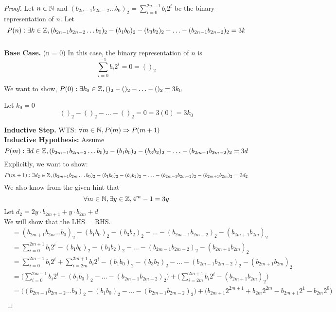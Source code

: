 \documentclass[12pt]{article}
\theoremstyle{definition}
\begin{document}
\begin{enumerate}
        \begin{proof}
            Let $n \in \mathbb N$ and $(b_{2n-1} b_{2n-2} \ldots b_0)_2 = \sum_{i=0}^{2n-1}b_i2^i$ be the binary representation of $n$.
            Let $$P(n): \exists k \in \mathbb Z, (b_{2n-1} b_{2n-2} \ldots b_0)_2 - (b_1b_0)_2 - (b_3b_2)_2 - \ldots - (b_{2n-1}b_{2n-2})_2 = 3k$$ \\
            \textbf{Base Case. }(n = 0)
            In this case, the binary representation of $n$ is $$\sum_{i=0}^{-1}b_i2^i = 0 = ()_2$$
            
            We want to show, $P(0): \exists k_0 \in \mathbb Z, ()_2 - ()_2 - \ldots - ()_2 = 3k_0$
            
            Let $k_0 = 0$
            $$()_2 - ()_2 - \ldots - ()_2 = 0 = 3(0) = 3k_0$$
            
            \textbf{Inductive Step. } WTS: $\forall m \in \mathbb N, P(m) \mathrel{\Rightarrow} P(m+1)$ \\
            \textbf{Inductive Hypothesis: } Assume $$P(m): \exists d \in \mathbb Z, (b_{2m-1} b_{2m-2} \ldots b_0)_2 - (b_1b_0)_2 - (b_3b_2)_2 - \ldots - (b_{2m-1}b_{2m-2})_2 = 3d$$ 
            Explicitly, we want to show:
            $$P(m+1): \exists d_2 \in \mathbb Z, (b_{2m+1} b_{2m} \ldots b_0)_2 - (b_1b_0)_2 - (b_3b_2)_2 - \ldots - (b_{2m-1}b_{2m-2})_2 - (b_{2m+1}b_{2m})_2 = 3d_2$$
            We also know from the given hint that $$\forall m \in \mathbb N, \exists y \in \mathbb Z, 4^m - 1 = 3y $$
            Let $d_2 = 2y \cdot b_{2m+1} + y \cdot b_{2m} + d$\\
            We will show that the LHS = RHS.
            \begin{align*}
                &= (b_{2m+1} b_{2m} \ldots b_0)_2 - (b_1b_0)_2 - (b_3b_2)_2 - \ldots - (b_{2m-1}b_{2m-2})_2 - (b_{2m+1}b_{2m})_2 \\
                &= \sum_{i=0}^{2m+1} b_i2^i - (b_1b_0)_2 - (b_3b_2)_2 - \ldots - (b_{2m-1}b_{2m-2})_2 - (b_{2m+1}b_{2m})_2 \\
                &= \sum_{i=0}^{2m-1} b_i2^i + \sum_{i=2m}^{2m+1} b_i2^i  - (b_1b_0)_2 - (b_3b_2)_2 - \ldots - (b_{2m-1}b_{2m-2})_2 - (b_{2m+1}b_{2m})_2 \\
                &= \bigg(\sum_{i=0}^{2m-1} b_i2^i - (b_1b_0)_2 - \ldots - (b_{2m-1}b_{2m-2})_2 \bigg) + \bigg(\sum_{i=2m}^{2m+1} b_i2^i   - (b_{2m+1}b_{2m})_2\bigg) \\
                &= \big((b_{2m-1}b_{2m-2}\ldots b_0)_2 - (b_1b_0)_2 - \ldots - (b_{2m-1}b_{2m-2})_2\big) + \big(b_{2m+1} 2^{2m + 1} + b_{2m} 2^{2m} -  b_{2m+1} 2^{1} - b_{2m} 2^{0}\big) \\

\end{align*}
\end{proof}
\end{enumerate}
\end{document}
